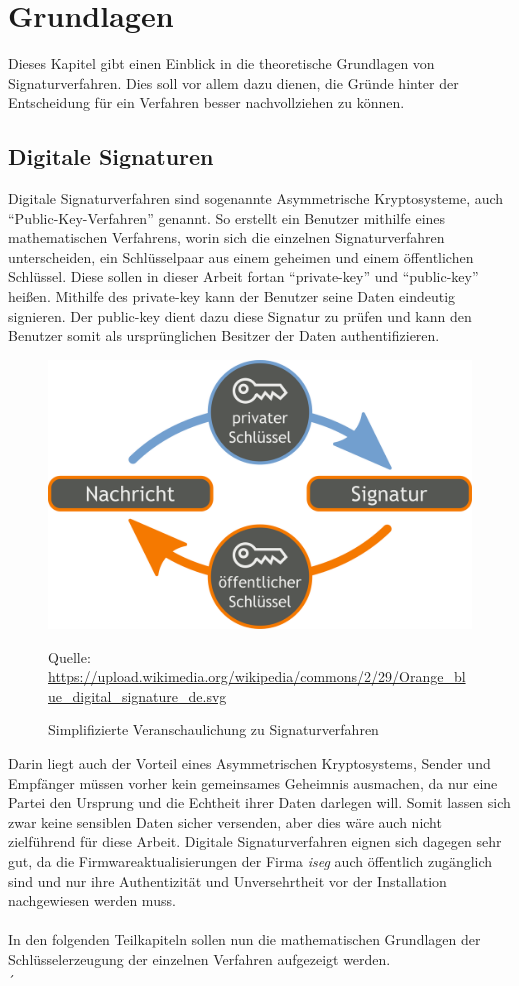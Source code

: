 \documentclass[thesis=bachelor,faculty=cb]{hsmw-thesis}
\begin{document}
\chapter{Grundlagen}
Dieses Kapitel gibt einen Einblick in die theoretische Grundlagen von Signaturverfahren. Dies soll vor allem dazu dienen, die Gründe hinter der \\ Entscheidung für ein Verfahren besser nachvollziehen zu können.
\section{Digitale Signaturen}
Digitale Signaturverfahren sind sogenannte Asymmetrische Kryptosysteme, auch \enquote{Public-Key-Verfahren} genannt. So erstellt ein Benutzer mithilfe eines mathematischen Verfahrens, worin sich die einzelnen Signaturverfahren unterscheiden, ein Schlüsselpaar aus einem geheimen und einem öffentlichen Schlüssel. Diese sollen in dieser Arbeit fortan \enquote{private-key} und \enquote{public-key} heißen. Mithilfe des private-key kann der Benutzer seine Daten eindeutig signieren. Der public-key dient dazu diese Signatur zu prüfen und kann den Benutzer somit als ursprünglichen Besitzer der Daten authentifizieren. 
\begin{figure}[H]
	\centering
	\includegraphics[scale=0.09]{images/Orange_blue_digital_signature_de.svg.png}
	\caption{Simplifizierte Veranschaulichung zu Signaturverfahren}{Quelle: \url{ https://upload.wikimedia.org/wikipedia/commons/2/29/Orange_blue_digital_signature_de.svg}}
\end{figure}
Darin liegt auch der Vorteil eines Asymmetrischen Kryptosystems, Sender und Empfänger müssen vorher kein gemeinsames Geheimnis ausmachen, da nur eine Partei den Ursprung und die Echtheit ihrer Daten darlegen will. Somit lassen sich zwar keine sensiblen Daten sicher versenden, aber dies wäre auch nicht zielführend für diese Arbeit. Digitale Signaturverfahren eignen sich dagegen sehr gut, da die Firmwareaktualisierungen der Firma \textit{iseg} auch öffentlich zugänglich sind und nur ihre Authentizität und Unversehrtheit vor der Installation nachgewiesen werden muss. \\
\\[1cm]
In den folgenden Teilkapiteln sollen nun die mathematischen Grundlagen der Schlüsselerzeugung der einzelnen Verfahren aufgezeigt werden.
\\[1cm]´
\end{document}
